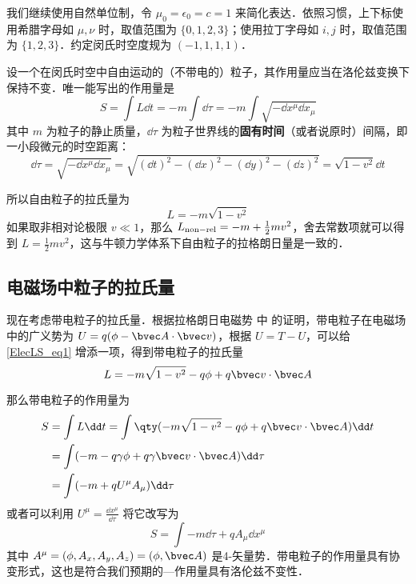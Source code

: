 
我们继续使用自然单位制，令 $\mu_0=\epsilon_0=c=1$ 来简化表达．依照习惯，上下标使用希腊字母如 $\mu, \nu$ 时，取值范围为 $\{0, 1, 2, 3\}$；使用拉丁字母如 $i, j$ 时，取值范围为 $\{1, 2, 3\}$．约定闵氏时空度规为 $(-1,1,1,1)$．

设一个在闵氏时空中自由运动的（不带电的）粒子，其作用量应当在洛伦兹变换下保持不变．唯一能写出的作用量是
\begin{equation}
S=\int L\dd t=-m\int \dd \tau=-m\int \sqrt{-\dd x^\mu \dd x_\mu}
\end{equation}
其中 $m$ 为粒子的静止质量，$\dd \tau$ 为粒子世界线的\textbf{固有时间}（或者说原时）间隔，即一小段微元的时空距离：
\begin{equation}
\dd \tau=\sqrt{-\dd x^\mu\dd x_\mu}=\sqrt{(\dd t)^2-(\dd x)^2-(\dd y)^2-(\dd z)^2}=\sqrt{1-v^2}\dd t
\end{equation}

所以自由粒子的拉氏量为
\begin{equation}\label{ElecLS_eq1}
L=-m\sqrt{1-v^2}
\end{equation}
如果取非相对论极限 $v\ll 1$，那么 $L_{\rm{non-rel}}=-m+\frac{1}{2}mv^2$，舍去常数项就可以得到 $L=\frac{1}{2}mv^2$，这与牛顿力学体系下自由粒子的拉格朗日量是一致的．
\subsection{电磁场中粒子的拉氏量}
现在考虑带电粒子的拉氏量．根据拉格朗日电磁势 中  的证明，带电粒子在电磁场中的广义势为 $U=q(\phi-\bvec A\cdot \bvec v)$，根据 $U=T-U$，可以给\autoref{ElecLS_eq1} 增添一项，得到带电粒子的拉氏量
\begin{equation}\label{ElecLS_eq2}
L=-m\sqrt{1-v^2}-q\phi+q\bvec v\cdot \bvec A
\end{equation}

那么带电粒子的作用量为
\begin{equation}\label{ElecLS_eq3}
\begin{aligned}
S&=\int L\dd t=\int \qty(-m\sqrt{1-v^2}-q\phi +q\bvec v\cdot \bvec A)\dd t\\
&=\int (-m-q\gamma\phi+q\gamma\bvec v\cdot \bvec A)\dd \tau\\
&=\int (-m+qU^\mu A_\mu)\dd \tau
\end{aligned}
\end{equation}
或者可以利用 $U^\mu= \frac{\dd x^\mu}{\dd \tau}$ 将它改写为
\begin{equation}\label{ElecLS_eq4}
S=\int -m\dd \tau+qA_\mu \dd x^\mu
\end{equation}
其中 $A^\mu=(\phi,A_x,A_y,A_z)=(\phi,\bvec A)$ 是4-矢量势．带电粒子的作用量具有协变形式，这也是符合我们预期的—作用量具有洛伦兹不变性．

